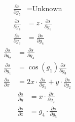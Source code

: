\begin{multicols}{3}
    \noindent
    \begin{align*}
        \frac{\partial s}{\partial g_5} &= \text{Unknown}\\
        \frac{\partial s}{\partial g_4} &= z\cdot\frac{\partial s}{\partial g_5}\\
        \frac{\partial s}{\partial g_3} &= \frac{\partial s}{\partial g_4}
    \end{align*}
    \begin{align*}
        \frac{\partial s}{\partial g_2} &= \frac{\partial s}{\partial g_4} \\
        \frac{\partial s}{\partial g_1} &= \cos(g_1)\frac{\partial s}{\partial g_3}\\
        \frac{\partial s}{\partial x}   &= 2x\cdot\frac{\partial s}{\partial g_1} + y\cdot\frac{\partial s}{\partial g_2}
    \end{align*}
    \begin{align*}
        \frac{\partial s}{\partial y}   &= x\cdot\frac{\partial s}{\partial g_2}\\
        \frac{\partial s}{\partial z}   &= g_4\cdot\frac{\partial s}{\partial g_5}
    \end{align*}
\end{multicols}

